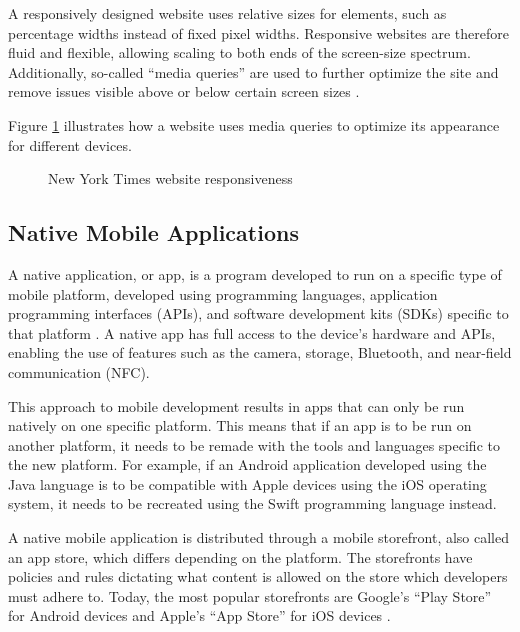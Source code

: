 \documentclass[a4paper,12pt]{article}
\begin{document}
A responsively designed website uses relative sizes for elements, such as percentage widths instead of fixed pixel widths. Responsive websites are therefore fluid and flexible, allowing scaling to both ends of the screen-size spectrum. Additionally, so-called “media queries” are used to further optimize the site and remove issues visible above or below certain screen sizes \cite{resp_web_2011}. 

Figure \ref{fig:responsiveness} illustrates how a website uses media queries to optimize its appearance for different devices.

\begin{figure}[h]%
	\centering
	\quad
	\caption{New York Times website responsiveness}%
	\label{fig:responsiveness}%
\end{figure}

\subsection{Native Mobile Applications}
A native application, or app, is a program developed to run on a specific type of mobile platform, developed using programming languages, application programming interfaces (APIs), and software development kits (SDKs) specific to that platform \cite{crossplatform_taxonomy, mobile_web_apps_2013}. A native app has full access to the device’s hardware and APIs, enabling the use of features such as the camera, storage, Bluetooth, and near-field communication (NFC). 

This approach to mobile development results in apps that can only be run natively on one specific platform. This means that if an app is to be run on another platform, it needs to be remade with the tools and languages specific to the new platform. For example, if an Android application developed using the Java language is to be compatible with Apple devices using the iOS operating system, it needs to be recreated using the Swift programming language instead. 

A native mobile application is distributed through a mobile storefront, also called an app store, which differs depending on the platform. The storefronts have policies and rules dictating what content is allowed on the store which developers must adhere to. Today, the most popular storefronts are  Google’s “Play Store” for Android devices and Apple’s “App Store” for iOS devices \cite{numofapps_in_stores}. 
\end{document}
